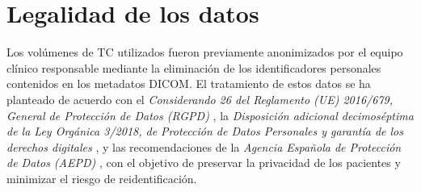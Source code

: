 
\section{Legalidad de los datos}

Los volúmenes de TC utilizados fueron previamente anonimizados por el equipo clínico responsable mediante la eliminación de los identificadores personales contenidos en los metadatos DICOM. El tratamiento de estos datos se ha planteado de acuerdo con el \emph{Considerando 26 del Reglamento (UE) 2016/679, General de Protección de Datos (RGPD)} \cite{gdprRecital26}, la \emph{Disposición adicional decimoséptima de la Ley Orgánica 3/2018, de Protección de Datos Personales y garantía de los derechos digitales} \cite{lopd2018}, y las recomendaciones de la \emph{Agencia Española de Protección de Datos (AEPD)} \cite{aepdAnonimizacion}, con el objetivo de preservar la privacidad de los pacientes y minimizar el riesgo de reidentificación.





